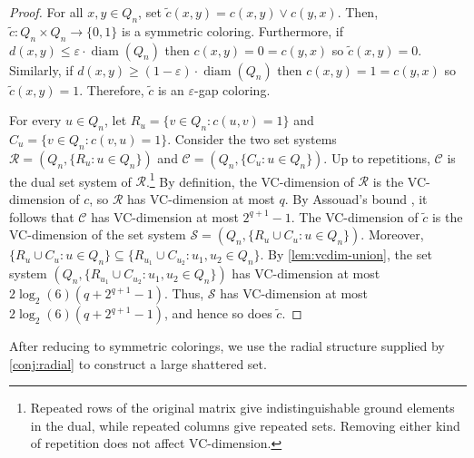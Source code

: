 \documentclass[11pt]{article}
\DeclareMathOperator{\diam}{diam}
\theoremstyle{remark}
\begin{document}
\begin{proof}
    For all $x, y \in Q_n$, set $\widetilde{c}(x, y) = c(x, y) \vee c(y, x)$.
    Then, $\widetilde{c} : Q_n \times Q_n \to \{0, 1\}$ is a symmetric coloring.
    Furthermore, if $d(x, y) \leq \varepsilon \cdot \diam(Q_n)$ then $c(x, y) = 0 = c(y, x)$ so $\widetilde{c}(x, y) = 0$.
    Similarly, if $d(x, y) \geq (1-\varepsilon) \cdot \diam(Q_n)$ then $c(x, y) = 1 = c(y, x)$ so $\widetilde{c}(x, y) = 1$.
    Therefore, $\widetilde{c}$ is an $\varepsilon$-gap coloring.
    
    For every $u \in Q_n$, let $R_u = \{v \in Q_n : c(u, v) = 1\}$ and $C_u = \{v \in Q_n : c(v, u) = 1\}$.
    Consider the two set systems $\mathcal{R} = (Q_n, \{R_u : u \in Q_n\})$ and $\mathcal{C} = (Q_n, \{C_u : u \in Q_n\})$.
    Up to repetitions, $\mathcal{C}$ is the dual set system of $\mathcal{R}$.\footnote{Repeated rows of the original matrix give indistinguishable ground elements in the dual, while repeated columns give repeated sets. Removing either kind of repetition does not affect VC-dimension.}
    By definition, the VC-dimension of $\mathcal{R}$ is the VC-dimension of $c$, so $\mathcal{R}$ has VC-dimension at most $q$.
    By Assouad's bound \cite{A83}, it follows that $\mathcal{C}$ has VC-dimension at most $2^{q+1}-1$.
    The VC-dimension of $\widetilde{c}$ is the VC-dimension of the set system $\mathcal{S} = (Q_n, \{R_{u} \cup C_{u} : u \in Q_n\})$.
    Moreover, $\{R_{u} \cup C_{u} : u \in Q_n\} \subseteq \{R_{u_1} \cup C_{u_2} : u_1, u_2 \in Q_n\}$.
    By \cref{lem:vcdim-union}, the set system $(Q_n, \{R_{u_1} \cup C_{u_2} : u_1, u_2 \in Q_n\})$ has VC-dimension at most $2\log_2(6)(q+2^{q+1}-1)$.
    Thus, $\mathcal{S}$ has VC-dimension at most $2\log_2(6)(q+2^{q+1}-1)$, and hence so does $\widetilde{c}$.
\end{proof}

After reducing to symmetric colorings, we use the radial structure supplied by \cref{conj:radial} to construct a large shattered set.

\radialimpliesghs* 
\end{document}
